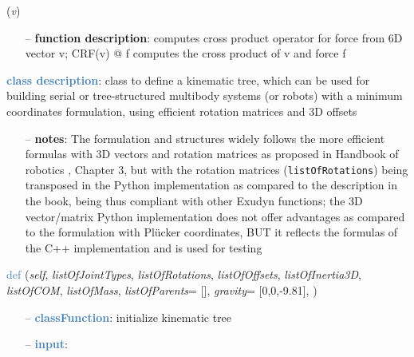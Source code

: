 \begin{itemize}[leftmargin=1.4cm]
\begin{itemize}[leftmargin=0.5cm]
\begin{itemize}[leftmargin=1.4cm]
\begin{itemize}[leftmargin=0.5cm]
\begin{itemize}[leftmargin=1.4cm]
\begin{itemize}[leftmargin=0.5cm]
\begin{itemize}[leftmargin=1.4cm]
\begin{itemize}[leftmargin=1.4cm]
\begin{itemize}[leftmargin=1.4cm]
\begin{flushleft}
\label{sec:kinematicTree:CRF}
({\it v})
\end{flushleft}
\setlength{\itemindent}{0.7cm}
\begin{itemize}[leftmargin=0.7cm]
  \item[--]  {\bf function description}: computes cross product operator for force from 6D vector v; CRF(v) @ f computes the cross product of v and force f\vspace{12pt}\end{itemize}
%
\noindent\textcolor{steelblue}{{\bf class description}}:  class to define a kinematic tree, which can be used for building serial or tree-structured multibody systems
         (or robots) with a minimum coordinates formulation, using efficient rotation matrices and 3D offsets
\setlength{\itemindent}{0.7cm}
\begin{itemize}[leftmargin=0.7cm]
  \item[--]  {\bf notes}: The formulation and structures widely follows the more efficient formulas with 3D vectors and rotation matrices as proposed in Handbook of robotics \cite{Siciliano2016}, Chapter 3, but with the rotation matrices (\texttt{listOfRotations}) being transposed in the Python implementation as compared to the description in the book, being thus compliant with other Exudyn functions; the 3D vector/matrix Python implementation does not offer advantages as compared to the formulation with Pl\"ucker coordinates, BUT it reflects the formulas of the C++ implementation and is used for testing\vspace{24pt}\end{itemize}
%
\begin{flushleft}
\noindent \textcolor{steelblue}{def {\bf {}}}\label{sec:kinematicTree:KinematicTree:__init__}
({\it self}, {\it listOfJointTypes}, {\it listOfRotations}, {\it listOfOffsets}, {\it listOfInertia3D}, {\it listOfCOM}, {\it listOfMass}, {\it listOfParents}= [], {\it gravity}= [0,0,-9.81], {\it })
\end{flushleft}
\setlength{\itemindent}{0.7cm}
\begin{itemize}[leftmargin=0.7cm]
  \item[--]  \textcolor{steelblue}{\bf classFunction}: initialize kinematic tree  \item[--]  \textcolor{steelblue}{\bf input}: \vspace{-6pt}

\end{itemize}
\end{itemize}
\end{itemize}
\end{itemize}
\end{itemize}
\end{itemize}
\end{itemize}
\end{itemize}
\end{itemize}
\end{itemize}
